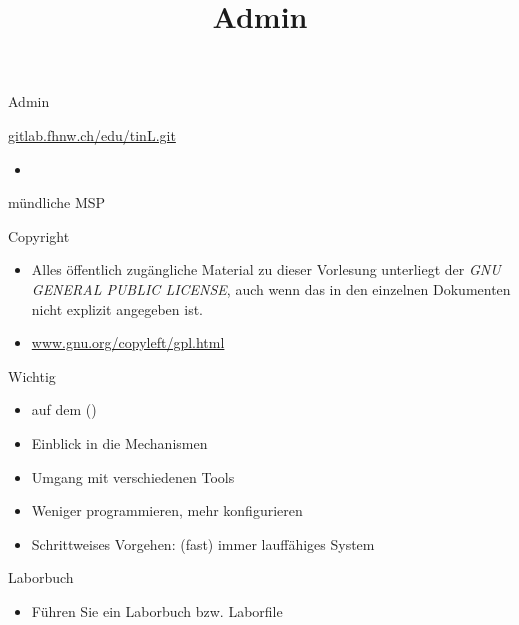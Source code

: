 \title[Admin]{Admin}
\frame{\titlepage}

\begin{frame}{Admin}
\begin{description}
 \item[git]{\tiny\url{gitlab.fhnw.ch/edu/tinL.git}}
 \begin{itemize}
  \item {}
 \end{itemize}
 \item[Prüfung] mündliche MSP
\end{description}
\end{frame}

\begin{frame}{Copyright}
 \begin{itemize}
  \item Alles öffentlich zugängliche Material zu dieser Vorlesung unterliegt
  der {\em GNU GENERAL PUBLIC LICENSE}, auch wenn das in den einzelnen
  Dokumenten nicht explizit angegeben ist. 
  \item
  \url{www.gnu.org/copyleft/gpl.html}
 \end{itemize}
\end{frame}

\begin{frame}{Wichtig}
 \begin{itemize}
  \item \linux auf dem \beaglebone (\targetS)
  \item Einblick in die Mechanismen
  \item Umgang mit verschiedenen Tools
  \item Weniger programmieren, mehr konfigurieren
  \item Schrittweises Vorgehen: (fast) immer lauffähiges System
 \end{itemize}
\end{frame}

\begin{frame}{Laborbuch}
 \begin{itemize}
  \item Führen Sie ein Laborbuch bzw. Laborfile
 \end{itemize}
\end{frame}


